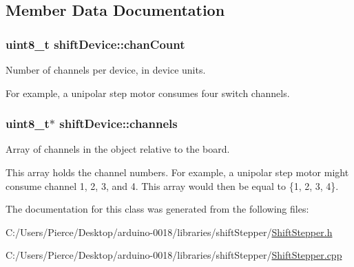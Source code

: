 \subsection{Member Data Documentation}
\hypertarget{classshift_device_a8eed8391ef608036d0f55f42348c0e41}{
\subsubsection[{chanCount}]{\setlength{\rightskip}{0pt plus 5cm}uint8\_\-t {\bf shiftDevice::chanCount}}}
\label{classshift_device_a8eed8391ef608036d0f55f42348c0e41}


Number of channels per device, in device units. 

For example, a unipolar step motor consumes four switch channels. \hypertarget{classshift_device_ac63a0543346c357134fd207a47976bab}{
\subsubsection[{channels}]{\setlength{\rightskip}{0pt plus 5cm}uint8\_\-t$\ast$ {\bf shiftDevice::channels}}}
\label{classshift_device_ac63a0543346c357134fd207a47976bab}


Array of channels in the object relative to the board. 

This array holds the channel numbers. For example, a unipolar step motor might consume channel 1, 2, 3, and 4. This array would then be equal to \{1, 2, 3, 4\}. 

The documentation for this class was generated from the following files:\begin{DoxyCompactItemize}
\item 
C:/Users/Pierce/Desktop/arduino-\/0018/libraries/shiftStepper/\hyperlink{_shift_stepper_8h}{ShiftStepper.h}\item 
C:/Users/Pierce/Desktop/arduino-\/0018/libraries/shiftStepper/\hyperlink{_shift_stepper_8cpp}{ShiftStepper.cpp}\end{DoxyCompactItemize}
